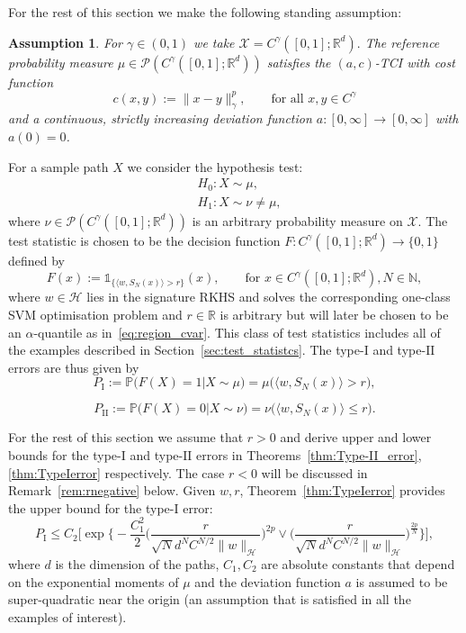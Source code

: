 \documentclass[twoside,11pt]{article}
\numberwithin{equation}{section}
\numberwithin{theorem}{section}
\newcommand{\R}{\mathbb{R}}
\newcommand{\X}{\mathcal{X}}
\newcommand{\N}{\mathbb{N}}
\newcommand{\pr}{\mathbb{P}}
\newcommand{\h}{\mathcal{H}}
\newtheorem{assumption}[theorem]{Assumption}
\begin{document}
For the rest of this section we make the following standing assumption: 

\begin{assumption}\label{assumption:mu} For $\gamma\in(0,1)$ we take $\X=C^\gamma([0,1];\R^d).$ The reference probability measure $\mu\in\mathscr{P}(C^\gamma([0,1];\R^d))$ satisfies the $(a, c)$-TCI with cost function $$
c(x,y):=\|x-y\|^p_\gamma,
\qquad\text{for all }
x,y\in C^\gamma
$$
and a continuous, strictly increasing \textit{deviation function} $a:[0,\infty]\rightarrow[0,\infty]$ with $a(0)=0$.
    \end{assumption}

 For a sample path $X$ we consider the hypothesis test: 
\begin{equation}\label{eq:HypothesisTestTCI}
    \begin{aligned}
        &H_0: X\sim\mu,\\
        &
        H_1: X\sim\nu\neq\mu,
    \end{aligned}
\end{equation}
where $\nu\in \mathscr{P}(C^\gamma([0,1];\R^d))$ is an arbitrary probability measure on $\X.$ The test statistic is chosen to be the decision function $F:C^\gamma([0,1];\R^d)\rightarrow \{0,1\}$
defined by 
 $$
F(x):=\mathds{1}_{\{\langle w, S_N(x)\rangle> r\}}(x),
\qquad\text{for } x\in C^\gamma\left([0,1];\R^d\right), N\in\N,
$$
where $w\in\h$ lies in the signature RKHS and solves the corresponding one-class SVM optimisation problem and $r\in\R$ is arbitrary but will later be chosen to be an $\alpha$-quantile as in~\eqref{eq:region_cvar}. This class of test statistics includes all of the examples described in Section~\ref{sec:test_statistcs}.
The type-$\mathrm{I}$ and type-$\mathrm{II}$ errors are thus given by
\begin{equation}\label{eq:typeI}
P_{\mathrm{I}}:=\pr\bigg( F(X)=1| X\sim\mu   \bigg)=\mu\bigg( \langle w, S_N(x)\rangle> r    \bigg),
\end{equation}

\begin{equation}\label{eq:typeII}
P_{\mathrm{II}}:=\pr\bigg( F(X)=0| X\sim\nu   \bigg)=\nu\bigg( \langle w, S_N(x)\rangle\leq  r    \bigg).
\end{equation}

For the rest of this section we assume that $r>0$ and derive upper and lower bounds for the type-$\mathrm{I}$ and type-$\mathrm{II}$ errors in Theorems~\ref{thm:Type-II_error}, \ref{thm:TypeIerror} respectively. 
The case $r<0$ will be discussed in Remark~\ref{rem:rnegative} below.
Given $w, r$, Theorem~\ref{thm:TypeIerror} provides the upper bound for the type-$\mathrm{I}$ error:
$$
P_{\mathrm{I}}\leq C_2
\bigg[\exp\bigg\{-\frac{C^2_1}{2}\bigg(\frac{r}{\sqrt{N}d^{N}C^{N/2}\|w\|_{\h}}\bigg)^{2p}\vee \bigg(\frac{r}{\sqrt{N}d^{N}C^{N/2}\|w\|_{\h}}\bigg)^{\frac{2p}{N}}      \bigg\}\bigg], 
$$
where $d$ is the dimension of the paths, $C_1, C_2$ are absolute constants that depend on the exponential moments of $\mu$ and the deviation function $a$ is assumed to be super-quadratic near the origin (an assumption that is satisfied in all the examples of interest).
\end{document}
